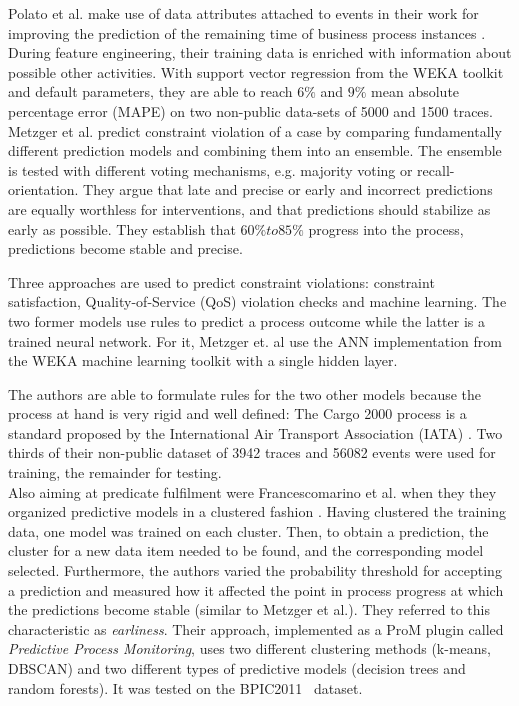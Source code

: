 Polato et al. make use of data attributes attached to events in their work for improving the prediction of the remaining time of business process instances \cite{polato2014}. During feature engineering, their training data is enriched with information about possible other activities. With support vector regression from the WEKA toolkit~\cite{web:weka} and default parameters, they are able to reach $6\%$ and $9\%$ mean absolute percentage error (MAPE) on two non-public data-sets of 5000 and 1500 traces.\\

Metzger et al. predict constraint violation of a case by comparing fundamentally different prediction models and combining them into an ensemble. The ensemble is tested with different voting mechanisms, e.g. majority voting or recall-orientation. They argue that late and precise or early and incorrect predictions are equally worthless for interventions, and that predictions should stabilize as early as possible. They establish that $60\% to 85\%$ progress into the process, predictions become stable and precise.

Three approaches are used to predict constraint violations: constraint satisfaction, Quality-of-Service (QoS) violation checks and machine learning. The two former models use rules to predict a process outcome while the latter is a trained neural network. For it, Metzger et. al use the ANN implementation from the WEKA machine learning toolkit with a single hidden layer.

The authors are able to formulate rules for the two other models because the process at hand is very rigid and well defined: The Cargo 2000 process is a standard proposed by the International Air Transport Association (IATA) \cite{metzger2015}. Two thirds of their non-public dataset of 3942 traces and 56082 events were used for training, the remainder for testing.\\

Also aiming at predicate fulfilment were Francescomarino et al. when they they organized predictive models in a clustered fashion \cite{francescomarino2015}. Having clustered the training data, one model was trained on each cluster. Then, to obtain a prediction, the cluster for a new data item needed to be found, and the corresponding model selected. Furthermore, the authors varied the probability threshold for accepting a prediction and measured how it affected the point in process progress at which the predictions become stable (similar to Metzger et al.). They referred to this characteristic as \textit{earliness}. Their approach, implemented as a ProM plugin called \textit{Predictive Process Monitoring}, uses two different clustering methods (k-means, DBSCAN) and two different types of predictive models (decision trees and random forests). It was tested on the BPIC2011~\cite{BPIC2011} dataset.


